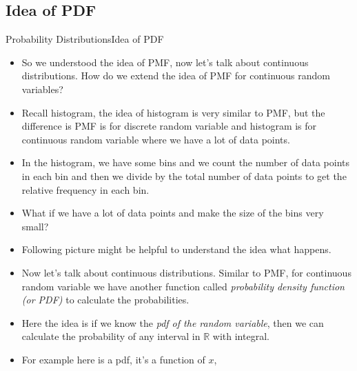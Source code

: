 \documentclass[8pt, usepdftitle=false]{beamer}
\begin{document}
\subsection{Idea of PDF}
\frame{\subsectionpage}


\begin{frame}[allowframebreaks]{Probability Distributions}{Idea of PDF}

\begin{itemize}

\item So we understood the idea of PMF, now let's talk about continuous distributions. How do we extend the idea of PMF for continuous random variables?


\item Recall histogram, the idea of histogram is very similar to PMF, but the difference is PMF is for discrete random variable and histogram is for continuous random variable where we have a lot of data points.


\item In the histogram, we have some bins and we count the number of data points in each bin and then we divide by the total number of data points to get the relative frequency in each bin.


\item What if we have a lot of data points and make the size of the bins very small? 

\item Following picture might be helpful to understand the idea what happens.







\item Now let's talk about continuous distributions. Similar to PMF, for continuous random variable we have another function called \emph{probability density function (or PDF)} to calculate the probabilities. 


\item Here the idea is if we know the \emph{pdf of the random variable}, then we can calculate the probability of any interval in $\mathbb{R}$ with integral. 

\item For example here is a pdf, it's a function of $x$,


\end{itemize}
\end{frame}
\end{document}
